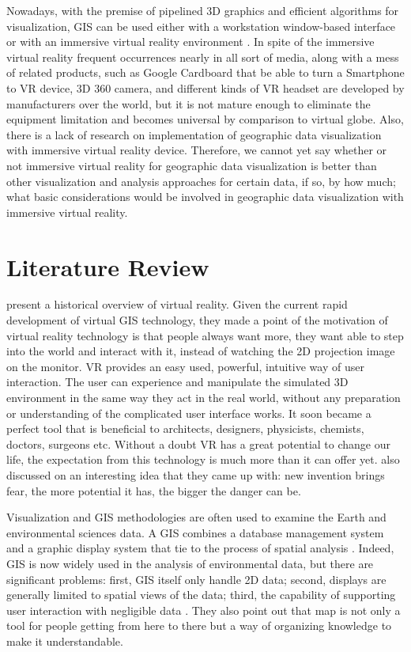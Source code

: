 Nowadays, with the premise of pipelined 3D graphics and efficient algorithms for visualization, GIS can be used either with a workstation window-based interface or with an immersive virtual reality environment \parencite{koller.virtual-gis.1995}. In spite of the immersive virtual reality frequent occurrences nearly in all sort of media, along with a mess of related products, such as Google Cardboard that be able to turn a Smartphone to VR device, 3D 360 camera, and different kinds of VR headset are developed by manufacturers over the world, but it is not mature enough to eliminate the equipment limitation and becomes universal by comparison to virtual globe. Also, there is a lack of research on implementation of geographic data visualization with immersive virtual reality device. Therefore, we cannot yet say whether or not immersive virtual reality for geographic data visualization is better than other visualization and analysis approaches for certain data, if so, by how much; what basic considerations would be involved in geographic data visualization with immersive virtual reality.

\section{Literature Review}
\label{section:literature-review}

\parencite{mazuryk.vr.1996} present a historical overview of virtual reality. Given the current rapid development of virtual GIS technology, they made a point of the motivation of virtual reality technology is that people always want more, they want able to step into the world and interact with it, instead of watching the 2D projection image on the monitor. VR provides an easy used, powerful, intuitive way of user interaction. The user can experience and manipulate the simulated 3D environment in the same way they act in the real world, without any preparation or understanding of the complicated user interface works. It soon became a perfect tool that is beneficial to architects, designers, physicists, chemists, doctors, surgeons etc. Without a doubt VR has a great potential to change our life, the expectation from this technology is much more than it can offer yet. \parencite{mazuryk.vr.1996} also discussed on an interesting idea that they came up with: new invention brings fear, the more potential it has, the bigger the danger can be.

Visualization and GIS methodologies are often used to examine the Earth and environmental sciences data. A GIS combines a database management system and a graphic display system that tie to the process of spatial analysis \parencite{rhyne.visualization-gis.1994, rhyne.virtual.1997}. Indeed, GIS is now widely used in the analysis of environmental data, but there are significant problems: first, GIS itself only handle 2D data; second, displays are generally limited to spatial views of the data; third, the capability of supporting user interaction with  negligible data \parencite{rhyne.visualization-gis.1994}. They also point out that map is not only a tool for people getting from here to there but a way of organizing knowledge to make it understandable.

